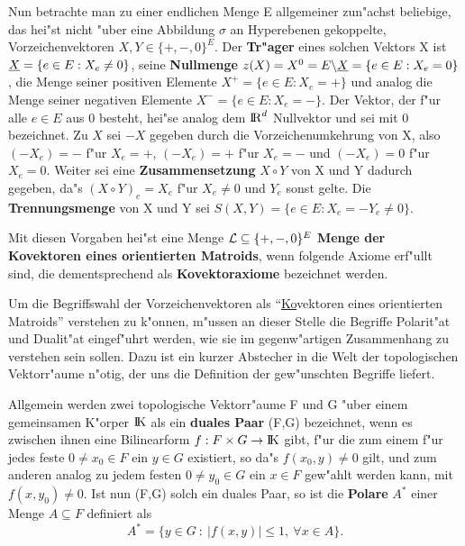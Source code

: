 Nun betrachte man zu einer endlichen Menge E allgemeiner zun"achst beliebige,
das hei"st nicht "uber eine Abbildung $\sigma$ an Hyperebenen gekoppelte,
Vorzeichenvektoren $X,Y\in\{+,-,0\}^E$.
Der {\bf Tr"ager} eines solchen Vektors X ist
$\underline{X}=\{e\in E:X_e\neq 0\}$, seine {\bf Nullmenge}
 $z(X)=X^0=E\backslash\underline{X}=\{e\in E:X_e=0\}$,
die Menge seiner positiven Elemente $X^+=\{e\in E:X_e=+\}$ und analog die Menge
seiner negativen Elemente $X^-=\{e\in E:X_e=-\}$. Der Vektor, der f"ur alle
$e\in E$ aus 0 besteht, hei"se analog dem $\mbox{$\rm I\!R$}^d$ Nullvektor und sei mit 0
bezeichnet. Zu $X$ sei $-X$ gegeben durch die Vorzeichenumkehrung von X, also
$(-X_e)=-$ f"ur $X_e=+$, $(-X_e)=+$ f"ur $X_e=-$ und $(-X_e)=0$ f"ur $X_e=0$.
Weiter sei eine {\bf Zusammensetzung}
$X\circ Y$ von X und Y dadurch gegeben, da"s $(X\circ Y)_e=X_e$ f"ur
$X_e\neq 0$ und $Y_e$ sonst gelte. Die {\bf Trennungsmenge}
 von X und Y sei
$S(X,Y)=\{e\in E:X_e=-Y_e\neq 0\}$.

Mit diesen Vorgaben hei"st eine Menge ${\cal L}\subseteq\{+,-,0\}^E$ {\bf Menge
der Kovektoren eines orientierten Matroids}, wenn folgende Axiome erf"ullt
sind, die dementsprechend als {\bf Kovektoraxiome}
bezeichnet werden.

\bcent
{}
\ecent

Um die Begriffswahl der Vorzeichenvektoren als "`\ul{Ko}vektoren eines
orientierten Matroids"' verstehen zu k"onnen, m"ussen an dieser Stelle die
Begriffe Polarit"at und Dualit"at eingef"uhrt werden, wie sie im gegenw"artigen
Zusammenhang zu verstehen sein sollen. Dazu ist ein kurzer Abstecher in die
Welt der topologischen Vektorr"aume n"otig, der uns die Definition der
gew"unschten Begriffe liefert.

Allgemein werden zwei topologische Vektorr"aume F und G "uber einem gemeinsamen
K"orper $\mbox{$\rm I\!K$}$ als ein {\bf duales Paar} (F,G) bezeichnet, wenn
es zwischen ihnen eine Bilinearform $f:F\times G\to\mbox{$\rm I\!K$}$ gibt, f"ur die zum einem
f"ur jedes feste $0\neq x_0\in F$ ein $y\in G$ existiert, so da"s
$f(x_0,y)\neq 0$ gilt, und zum anderen analog zu jedem festen $0\neq y_0\in G$
ein $x\in F$ gew"ahlt werden kann, mit $f(x,y_0)\neq 0$. Ist nun (F,G) solch
ein duales Paar, so ist die {\bf Polare} $A^*$ einer Menge
$A\subseteq F$ definiert als
$$ A^*=\{y\in G~:~|f(x,y)|\leq 1,~\forall x\in A\}.$$


